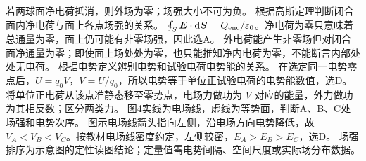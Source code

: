 \crosscheck 若两球面净电荷抵消，则外场为零；场强大小不可为负。
\problemtext 根据高斯定理判断闭合面内净电荷与面上各点场强的关系。
\workings $\oint_S\bm E\cdot\mathrm d\bm S=Q_{\rm enc}/\varepsilon_0$。净电荷为零只意味着总通量为零，面上仍可能有非零场强，因此选A。
\crosscheck 外电荷能产生非零场但对闭合面净通量为零；即使面上场处处为零，也只能推知净内电荷为零，不能断言内部处处无电荷。
\problemtext 根据电势定义辨别电势和试验电荷电势能的关系。
\workings 在选定同一电势零点后，$U=q_0V$，$V=U/q_0$，所以电势等于单位正试验电荷的电势能数值，选D。
\crosscheck 将单位正电荷从该点准静态移至零势点，电场力做功为 $V$ 对应的能量，外力做功为其相反数；区分两类力。
\problemtext 图4实线为电场线，虚线为等势面，判断A、B、C处场强和电势次序。
\workings 图示电场线箭头指向左侧，沿电场方向电势降低，故 $V_A<V_B<V_C$。按教材电场线密度约定，左侧较密，$E_A>E_B>E_C$，选D。
\crosscheck 场强排序为示意图的定性读图结论；定量值需电势间隔、空间尺度或实际场分布数据。

